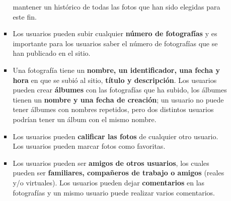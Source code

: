 \documentclass{article}
\begin{document}
\begin{enumerate}
\begin{enumerate}
\begin{itemize}
					mantener un histórico de todas las fotos que han sido elegidas para este fin.
					\item Los usuarios pueden subir cualquier \textbf{número de fotografías} y es importante
					para los usuarios saber el número de fotografías que se han publicado en el sitio.
					\item Una fotografía tiene un \textbf{nombre, un identificador, una fecha y hora} en que se subió al sitio, \textbf{título
					y descripción}. Los usuarios pueden crear \textbf{álbumes} con las fotografías que ha subido, los álbumes tienen un \textbf{nombre y una fecha de creación}; un usuario no puede tener álbumes con nombres
					repetidos, pero dos distintos usuarios podrían tener un álbum con el mismo nombre.
					\item Los usuarios pueden \textbf{calificar las fotos} de cualquier otro usuario. Los usuarios pueden marcar
					fotos como favoritas.
					\item Los usuarios pueden ser \textbf{amigos de otros usuarios}, los cuales pueden ser \textbf{familiares, compañeros
					de trabajo o amigos} (reales y/o virtuales). Los usuarios pueden dejar \textbf{comentarios} en las
					fotografías y un mismo usuario puede realizar varios comentarios.
				\end{itemize}
			\end{enumerate}
	\end{enumerate}
\end{document}
